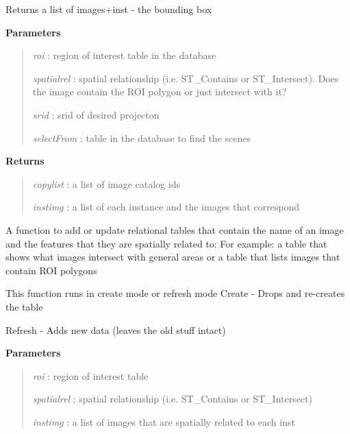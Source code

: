 \documentclass[letterpaper,10pt,openany,oneside]{sphinxmanual}
\begin{document}
\begin{fulllineitems}
\begin{fulllineitems}
\begin{description}
\end{description}

Returns a list of images+inst - the bounding box

\textbf{Parameters}
\begin{quote}

\emph{roi}        : region of interest table in the database

\emph{spatialrel} : spatial relationship (i.e. ST\_Contains or ST\_Intersect).  Does the image contain the ROI polygon or just intersect with it?

\emph{srid}       : srid of desired projecton

\emph{selectFrom} : table in the database to find the scenes
\end{quote}

\textbf{Returns}
\begin{quote}

\emph{copylist} : a list of image catalog ids

\emph{instimg}  : a list of each instance and the images that correspond
\end{quote}

\end{fulllineitems}


\begin{fulllineitems}
\label{code:Database.Database.relations2db}
A function to add or update relational tables that contain the name of an image
and the features that they are spatially related to:
For example:  a table that shows what images intersect with general areas or
a table that lists images that contain ROI polygons

This function runs in create mode or refresh mode
Create - Drops and re-creates the table

Refresh - Adds new data (leaves the old stuff intact)

\textbf{Parameters}
\begin{quote}

\emph{roi}        : region of interest table

\emph{spatialrel} : spatial relationship (i.e. ST\_Contains or ST\_Intersect)

\emph{instimg}    : a list of images that are spatially related to each inst


\end{quote}
\end{fulllineitems}
\end{fulllineitems}
\end{document}

